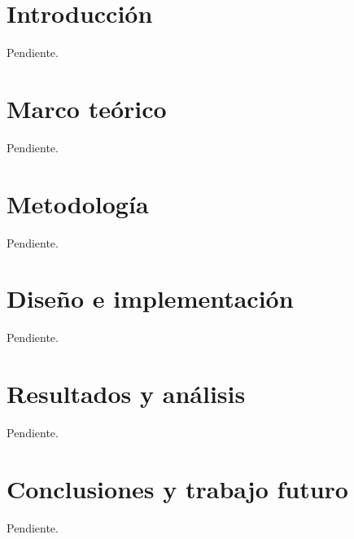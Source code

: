 \documentclass[11pt,letterpaper]{article}
\begin{document}


\singlespacing
\tableofcontents
\clearpage
\onehalfspacing

\setcounter{page}{1}

\section{Introducción}
Pendiente.

\section{Marco teórico}
Pendiente.

\section{Metodología}
Pendiente.

\section{Diseño e implementación}
Pendiente.

\section{Resultados y análisis}
Pendiente.

\section{Conclusiones y trabajo futuro}
Pendiente.


\end{document}
